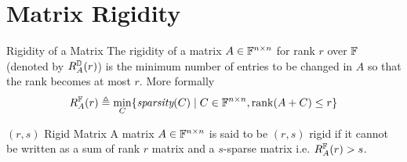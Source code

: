 \section{Matrix Rigidity}

\begin{definition}{Rigidity of a Matrix}{}
	The rigidity of a matrix $A\in\mathbb{F}^{n\times n}$ for rank $r$  over $\mathbb{F}$ (denoted by $R_A^{\mathbb{D}}(r)$) is the minimum number of entries to be changed in $A$  so that the rank becomes at most $r$. More formally  $$R_A^{\mathbb{F}}(r)\triangleq \min_{C}\{\textit{sparsity}(C)\mid C\in\mathbb{F}^{n\times n}, \operatorname{rank}(A+C)\leq r\}$$
\end{definition}
\begin{definition}{$(r,s)$ Rigid Matrix}{}
	A matrix $A\in \mathbb{F}^{n\times n}$ is said to be $(r,s)$ rigid if it cannot be written as a sum of rank $r$ matrix and a $s$-sparse matrix i.e. $R_A^{\mathbb{F}}(r)>s$. 
\end{definition}